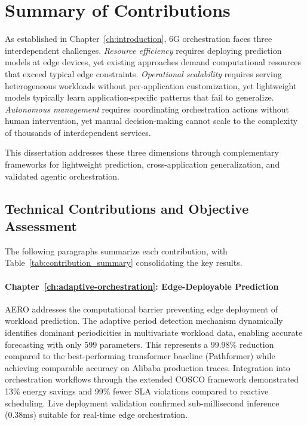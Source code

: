 \section{Summary of Contributions}
\label{sec:ch6_summary}

As established in Chapter~\ref{ch:introduction}, \ac{6G} orchestration faces three interdependent challenges. \textit{Resource efficiency} requires deploying prediction models at edge devices, yet existing approaches demand computational resources that exceed typical edge constraints. \textit{Operational scalability} requires serving heterogeneous workloads without per-application customization, yet lightweight models typically learn application-specific patterns that fail to generalize. \textit{Autonomous management} requires coordinating orchestration actions without human intervention, yet manual decision-making cannot scale to the complexity of thousands of interdependent services.

This dissertation addresses these three dimensions through complementary frameworks for lightweight prediction, cross-application generalization, and validated agentic orchestration.

\subsection{Technical Contributions and Objective Assessment}
\label{subsec:ch6_technical_summary}

The following paragraphs summarize each contribution, with Table~\ref{tab:contribution_summary} consolidating the key results.

\paragraph{Chapter~\ref{ch:adaptive-orchestration}: Edge-Deployable Prediction}
\ac{AERO} addresses the computational barrier preventing edge deployment of workload prediction. The adaptive period detection mechanism dynamically identifies dominant periodicities in multivariate workload data, enabling accurate forecasting with only 599 parameters. This represents a 99.98\% reduction compared to the best-performing transformer baseline (Pathformer) while achieving comparable accuracy on Alibaba production traces. Integration into orchestration workflows through the extended \ac{COSCO} framework demonstrated 13\% energy savings and 99\% fewer \ac{SLA} violations compared to reactive scheduling. Live deployment validation confirmed sub-millisecond inference (0.38ms) suitable for real-time edge orchestration.

